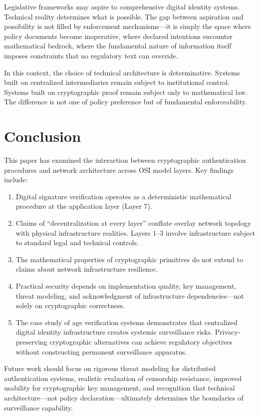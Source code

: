 \documentclass[11pt,a4paper]{article}
\begin{document}
Legislative frameworks may aspire to comprehensive digital identity systems. Technical reality determines what is possible. The gap between aspiration and possibility is not filled by enforcement mechanisms---it is simply the space where policy documents become inoperative, where declared intentions encounter mathematical bedrock, where the fundamental nature of information itself imposes constraints that no regulatory text can override.

In this context, the choice of technical architecture is determinative. Systems built on centralized intermediaries remain subject to institutional control. Systems built on cryptographic proof remain subject only to mathematical law. The difference is not one of policy preference but of fundamental enforceability.

\section{Conclusion}

This paper has examined the interaction between cryptographic authentication procedures and network architecture across OSI model layers. Key findings include:

\begin{enumerate}
    \item Digital signature verification operates as a deterministic mathematical procedure at the application layer (Layer 7).
    \item Claims of ``decentralization at every layer'' conflate overlay network topology with physical infrastructure realities. Layers 1--3 involve infrastructure subject to standard legal and technical controls.
    \item The mathematical properties of cryptographic primitives do not extend to claims about network infrastructure resilience.
    \item Practical security depends on implementation quality, key management, threat modeling, and acknowledgment of infrastructure dependencies---not solely on cryptographic correctness.
    \item The case study of age verification systems demonstrates that centralized digital identity infrastructure creates systemic surveillance risks. Privacy-preserving cryptographic alternatives can achieve regulatory objectives without constructing permanent surveillance apparatus.
\end{enumerate}

Future work should focus on rigorous threat modeling for distributed authentication systems, realistic evaluation of censorship resistance, improved usability for cryptographic key management, and recognition that technical architecture---not policy declaration---ultimately determines the boundaries of surveillance capability.
\end{document}
